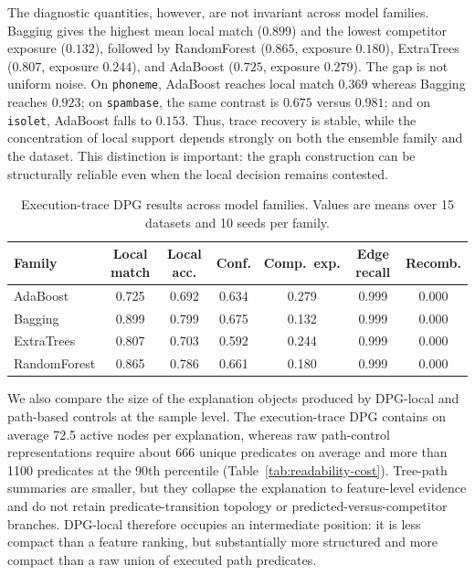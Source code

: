 \documentclass[runningheads]{llncs}
\begin{document}
The diagnostic quantities, however, are not invariant across model families. Bagging gives the highest mean local match ($0.899$) and the lowest competitor exposure ($0.132$), followed by RandomForest ($0.865$, exposure $0.180$), ExtraTrees ($0.807$, exposure $0.244$), and AdaBoost ($0.725$, exposure $0.279$). The gap is not uniform noise. On \texttt{phoneme}, AdaBoost reaches local match $0.369$ whereas Bagging reaches $0.923$; on \texttt{spambase}, the same contrast is $0.675$ versus $0.981$; and on \texttt{isolet}, AdaBoost falls to $0.153$. Thus, trace recovery is stable, while the concentration of local support depends strongly on both the ensemble family and the dataset. This distinction is important: the graph construction can be structurally reliable even when the local decision remains contested.

\begin{table}[ht!]
\centering
\small
\caption{Execution-trace DPG results across model families. Values are means over 15 datasets and 10 seeds per family.}
\label{tab:model-family}
\begin{tabular}{lcccccc}
\toprule
Family & Local match & Local acc. & Conf. & Comp.\ exp. & Edge recall & Recomb. \\
\midrule
AdaBoost      & 0.725 & 0.692 & 0.634 & 0.279 & 0.999 & 0.000 \\
Bagging       & 0.899 & 0.799 & 0.675 & 0.132 & 0.999 & 0.000 \\
ExtraTrees    & 0.807 & 0.703 & 0.592 & 0.244 & 0.999 & 0.000 \\
RandomForest  & 0.865 & 0.786 & 0.661 & 0.180 & 0.999 & 0.000 \\
\bottomrule
\end{tabular}
\end{table}

We also compare the size of the explanation objects produced by DPG-local and path-based controls at the sample level. The execution-trace DPG contains on average 72.5 active nodes per explanation, whereas raw path-control representations require about 666 unique predicates on average and more than 1100 predicates at the 90th percentile (Table~\ref{tab:readability-cost}). Tree-path summaries are smaller, but they collapse the explanation to feature-level evidence and do not retain predicate-transition topology or predicted-versus-competitor branches. DPG-local therefore occupies an intermediate position: it is less compact than a feature ranking, but substantially more structured and more compact than a raw union of executed path predicates.
\end{document}
